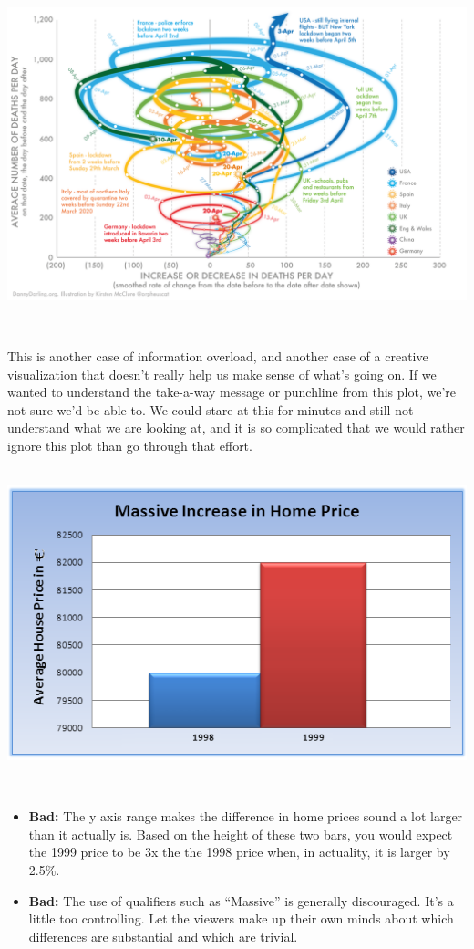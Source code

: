 \documentclass[]{book}
\begin{document}
\includegraphics{img/vis10.png}

~

This is another case of information overload, and another case of a creative visualization that doesn't really help us make sense of what's going on. If we wanted to understand the take-a-way message or punchline from this plot, we're not sure we'd be able to. We could stare at this for minutes and still not understand what we are looking at, and it is so complicated that we would rather ignore this plot than go through that effort.

~\\

\includegraphics{img/vis11.png}

~

\begin{itemize}
\item
  \textbf{Bad:} The y axis range makes the difference in home prices sound a lot larger than it actually is. Based on the height of these two bars, you would expect the 1999 price to be 3x the the 1998 price when, in actuality, it is larger by 2.5\%.
\item
  \textbf{Bad:} The use of qualifiers such as ``Massive'' is generally discouraged. It's a little too controlling. Let the viewers make up their own minds about which differences are substantial and which are trivial.
\end{itemize}
\end{document}

